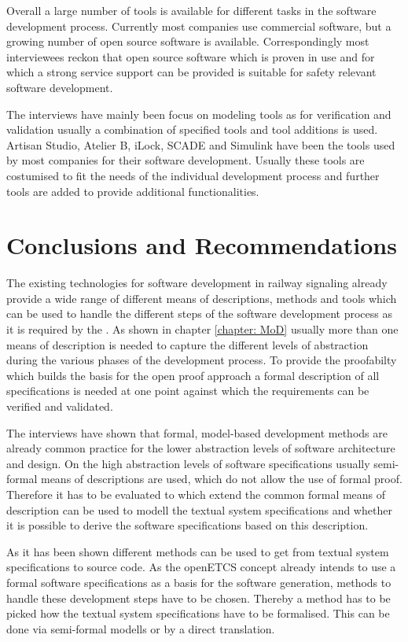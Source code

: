 \documentclass{./template/openetcs_report}
\begin{document}
Overall a large number of tools is available for different tasks in the software development process. Currently most companies use commercial software, but a growing number of open source software is available.  Correspondingly most interviewees reckon that open source software which is proven in use and for which a strong service support can be provided is suitable for  safety relevant software development. 

The interviews have mainly been focus on modeling tools as for verification and validation usually a combination of specified tools and tool additions is used. Artisan Studio, Atelier B, iLock, SCADE and Simulink have been the tools used by most companies for their software development. Usually these tools are  costumised to fit the needs of the individual development process and further tools are added to provide additional functionalities.

\chapter{Conclusions and Recommendations}

The existing technologies for software development in railway signaling already provide a wide range of different means of descriptions, methods and tools which can be used to handle the different steps of the software development process as it is required by the \citeauthor{EN50128:2011}. As shown in chapter \ref{chapter: MoD} usually more than one means of description is needed to capture the different levels of abstraction during the various phases of the development process. To provide the proofabilty which builds the basis for the open proof approach a formal description of all specifications is needed at one point against which the requirements can be verified and validated. 

The interviews have shown that formal, model-based development methods are already common practice for the lower abstraction levels of software architecture and design. On the high abstraction levels of  software specifications usually semi-formal means of descriptions are used, which do not allow the use of formal proof. Therefore it has to be evaluated to which extend the common formal means of description can be used to modell the textual system specifications and whether it is possible to derive the software specifications based on this description. 

As it has been shown different methods can be used to get from textual system specifications to source code. As the openETCS concept already intends to use a formal software specifications as a basis for the software generation, methods to handle these development steps have to be chosen. Thereby a method has to be picked how the textual system specifications have to be formalised. This can be done via semi-formal modells or by a direct translation. 
\end{document}
